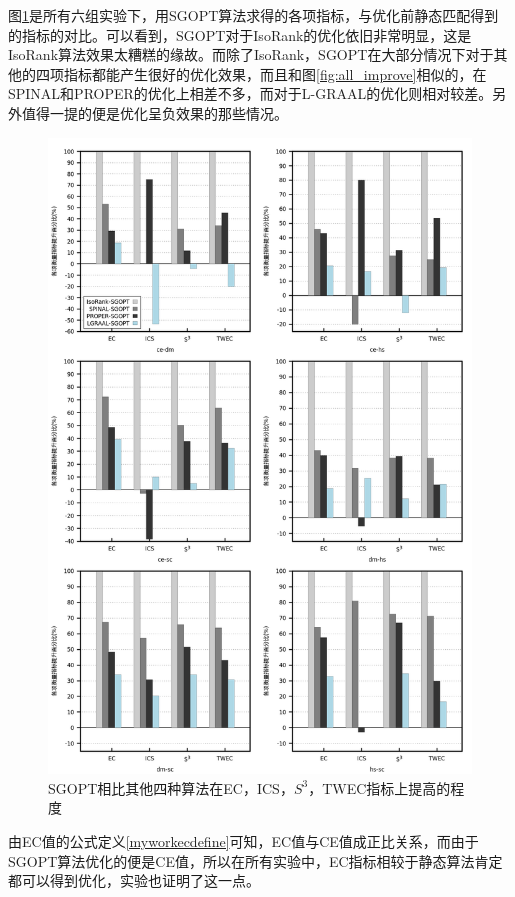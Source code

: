 图\ref{fig:other}是所有六组实验下，用SGOPT算法求得的各项指标，与优化前静态匹配得到的指标的对比。可以看到，SGOPT对于IsoRank的优化依旧非常明显，这是IsoRank算法效果太糟糕的缘故。而除了IsoRank，SGOPT在大部分情况下对于其他的四项指标都能产生很好的优化效果，而且和图\ref{fig:all_improve}相似的，在SPINAL和PROPER的优化上相差不多，而对于L-GRAAL的优化则相对较差。另外值得一提的便是优化呈负效果的那些情况。

\begin{figure}[htbp]
\centering
\includegraphics[width=\textwidth]{pic/other.png}
\caption{SGOPT相比其他四种算法在EC，ICS，$S^3$，TWEC指标上提高的程度} 
\label{fig:other}
\end{figure}

由EC值的公式定义\ref{myworkecdefine}可知，EC值与CE值成正比关系，而由于SGOPT算法优化的便是CE值，所以在所有实验中，EC指标相较于静态算法肯定都可以得到优化，实验也证明了这一点。

